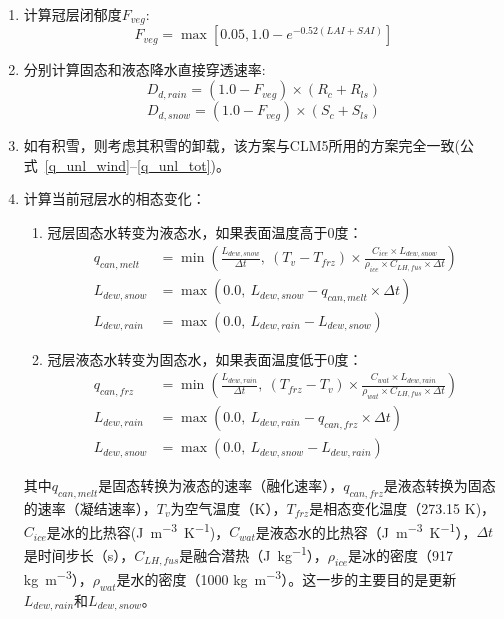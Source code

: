 \begin{enumerate}
\item 计算冠层闭郁度$F_{veg}$:
\begin{equation}
F_{veg} = \max\left[0.05,1.0-e^{-0.52\left(LAI+SAI\right)}\right]
\end{equation}
\item 分别计算固态和液态降水直接穿透速率:
\begin{equation}
D_{d,rain}=\left(1.0-F_{veg}\right) \times (R_{c}+R_{ls})
\end{equation}
\begin{equation}
D_{d,snow}=\left(1.0-F_{veg}\right) \times (S_{c}+S_{ls})
\end{equation}
\item 如有积雪，则考虑其积雪的卸载，该方案与CLM5所用的方案完全一致(公式~\eqref{q_unl_wind}--\eqref{q_unl_tot})。
\item 计算当前冠层水的相态变化：
\begin{enumerate}
\item 冠层固态水转变为液态水，如果表面温度高于0度：
\begin{equation}
\begin{aligned}
q_{can, melt} &=\min \left(\frac{L_{dew,snow}}{\Delta t},\ \left(T_{v}-T_{frz}\right) \times \frac{C_{ice} \times L_{dew,snow}}{\rho_{i c e} \times C_{LH, fus} \times \Delta t}\right) \\ 
L_{dew,snow} &=\max \left(0.0,\ L_{dew,snow}-q_{c a n, m e l t} \times \Delta t\right) \\
L_{dew,rain} &=\max \left(0.0,\ L_{dew,rain}-L_{dew,snow}\right)
\end{aligned}
\end{equation}
\item 冠层液态水转变为固态水，如果表面温度低于0度：
\begin{equation}
\begin{aligned}
q_{c a n, f r z} &=\min \left(\frac{L_{dew,rain}}{\Delta t},\ \left(T_{f r z}-T_{v}\right) \times \frac{C_{wat} \times L_{dew,rain}}{\rho_{wat} \times C_{LH, fus} \times \Delta t}\right) \\ 
L_{dew,rain} &=\max \left(0.0,\ L_{dew,rain}-q_{can, frz} \times \Delta t\right) \\
L_{dew,snow} &=\max \left(0.0,\ L_{dew,snow}-L_{dew,rain}\right)
\end{aligned}
\end{equation}
\end {enumerate}
其中$q_{can, melt}$是固态转换为液态的速率（融化速率），$q_{can, frz}$是液态转换为固态的速率（凝结速率），$T_{v}$为空气温度（K），$T_{frz}$是相态变化温度（273.15 K)，$C_{ice}$是冰的比热容(\unit{J.m^{-3}.K^{-1}})，$C_{wat}$是液态水的比热容（\unit{J.m^{-3}.K^{-1}}），$\Delta t$是时间步长（s），$C_{LH, fus}$是融合潜热（\unit{J.kg^{-1}}），$\rho_{ice}$是冰的密度（917 \unit{kg.m^{-3}}），$\rho_{wat}$是水的密度（1000 \unit{kg.m^{-3}}）。这一步的主要目的是更新$L_{dew,rain}$和$L_{dew,snow}$。


\end{enumerate}
